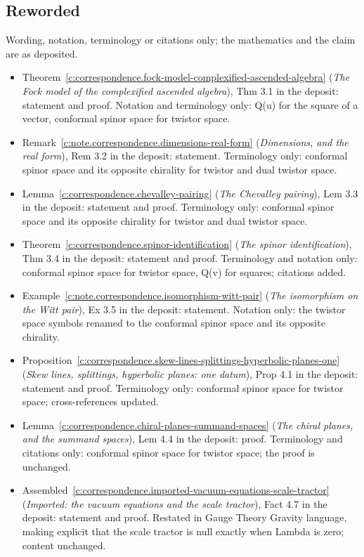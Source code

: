 \documentclass[11pt]{article}
\theoremstyle{definition}
\theoremstyle{plain}
\begin{document}
\subsection*{Reworded}
Wording, notation, terminology or citations only; the mathematics and the claim are as deposited.
\begin{itemize}\setlength{\itemsep}{2pt}
\item Theorem~\ref{c:correspondence.fock-model-complexified-ascended-algebra} (\emph{The Fock model of the complexified ascended algebra}), Thm 3.1 in the deposit: statement and proof. Notation and terminology only: Q(u) for the square of a vector, conformal spinor space for twistor space.
\item Remark~\ref{c:note.correspondence.dimensions-real-form} (\emph{Dimensions, and the real form}), Rem 3.2 in the deposit: statement. Terminology only: conformal spinor space and its opposite chirality for twistor and dual twistor space.
\item Lemma~\ref{c:correspondence.chevalley-pairing} (\emph{The Chevalley pairing}), Lem 3.3 in the deposit: statement and proof. Terminology only: conformal spinor space and its opposite chirality for twistor and dual twistor space.
\item Theorem~\ref{c:correspondence.spinor-identification} (\emph{The spinor identification}), Thm 3.4 in the deposit: statement and proof. Terminology and notation only: conformal spinor space for twistor space, Q(v) for squares; citations added.
\item Example~\ref{c:note.correspondence.isomorphism-witt-pair} (\emph{The isomorphism on the Witt pair}), Ex 3.5 in the deposit: statement. Notation only: the twistor space symbols renamed to the conformal spinor space and its opposite chirality.
\item Proposition~\ref{c:correspondence.skew-lines-splittings-hyperbolic-planes-one} (\emph{Skew lines, splittings, hyperbolic planes: one datum}), Prop 4.1 in the deposit: statement and proof. Terminology only: conformal spinor space for twistor space; cross-references updated.
\item Lemma~\ref{c:correspondence.chiral-planes-summand-spaces} (\emph{The chiral planes, and the summand spaces}), Lem 4.4 in the deposit: proof. Terminology and citations only: conformal spinor space for twistor space; the proof is unchanged.
\item Assembled~\ref{c:correspondence.imported-vacuum-equations-scale-tractor} (\emph{Imported: the vacuum equations and the scale tractor}), Fact 4.7 in the deposit: statement and proof. Restated in Gauge Theory Gravity language, making explicit that the scale tractor is null exactly when Lambda is zero; content unchanged.

\end{itemize}
\end{document}

